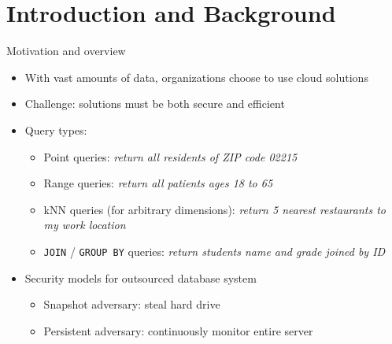 \section{Introduction and Background}

	\begin{frame}{Motivation and overview}

		\begin{itemize}
			\item<1-> With vast amounts of data, organizations choose to use cloud solutions
			\item<1-> \alert{Challenge:} solutions must be both secure and efficient
			\item<2-> Query types:
				\begin{itemize}
					\item<1,2,6-> Point queries: \emph{return all residents of ZIP code 02215}
					\item<1,3,6-> Range queries: \emph{return all patients ages 18 to 65}
					\item<1,4,6-> kNN queries (for arbitrary dimensions): \emph{return 5 nearest restaurants to my work location}
					\item<1,5,6-> \texttt{JOIN} / \texttt{GROUP BY} queries: \emph{return students name and grade joined by ID}
				\end{itemize}
			\item<6-> Security models for outsourced database system
				\begin{itemize}
					\item<1-5,7> Snapshot adversary: steal hard drive %
					\item<1-5,8> Persistent adversary: continuously monitor entire server %
				\end{itemize}
		\end{itemize}

	\end{frame}

